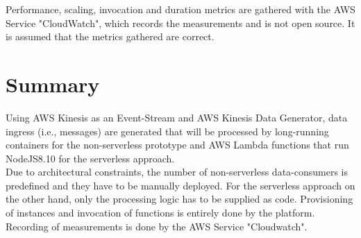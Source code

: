 Performance, scaling, invocation and duration metrics are gathered with the AWS Service "CloudWatch", which records the measurements and is not open source. It is assumed that the metrics gathered are correct.


\section{Summary}

Using AWS Kinesis as an Event-Stream and AWS Kinesis Data Generator, data ingress (i.e., messages) are generated that will be processed by long-running containers for the non-serverless prototype and AWS Lambda functions that run NodeJS8.10 for the serverless approach.\\
Due to architectural constraints, the number of non-serverless data-consumers is predefined and they have to be manually deployed. For the serverless approach on the other hand, only the processing logic has to be supplied as code. Provisioning of instances and invocation of functions is entirely done by the platform. \\
Recording of measurements is done by the AWS Service "Cloudwatch".